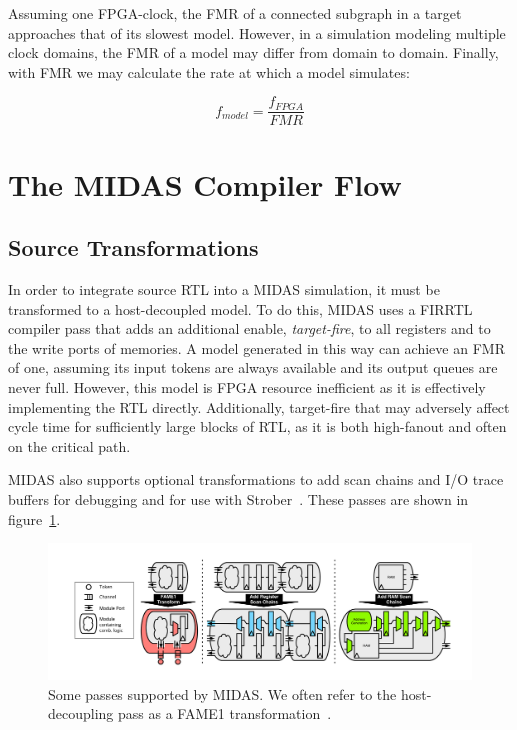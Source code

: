 \noindent Assuming one FPGA-clock, the FMR of a connected subgraph in a target
approaches that of its slowest model. However, in a simulation modeling
multiple clock domains, the FMR of a model may differ from domain to domain.
Finally, with FMR we may calculate the rate at which a model simulates:

$$ f_{model} = \frac{f_{FPGA}}{FMR} $$

\section{The MIDAS Compiler Flow}

\subsection{Source Transformations}\label{sec:source-transformations}

In order to integrate source RTL into a MIDAS simulation, it must be
transformed to a host-decoupled model.  To do this, MIDAS uses a
FIRRTL compiler pass that adds an additional enable, \emph{target-fire}, to all
registers and to the write ports of memories. A model generated in
this way can achieve an FMR of one, assuming its input tokens are always
available and its output queues are never full.  However, this model is FPGA
resource inefficient as it is effectively implementing the RTL directly.
Additionally, target-fire that may adversely affect cycle time for sufficiently
large blocks of RTL, as it is both high-fanout and often on the critical path.

MIDAS also supports optional transformations to add scan chains and I/O trace
buffers for debugging and for use with Strober~\cite{strober}. These passes
are shown in figure~\ref{fig:midas-passes}.

\begin{figure}
	\centering
	\includegraphics[width=16cm]{figures/midas-passes.pdf}
    \caption{Some passes supported by MIDAS. We often refer to the
    host-decoupling pass as a FAME1 transformation~\cite{fame}.}
	\label{fig:midas-passes}
	\centering
\end{figure}


